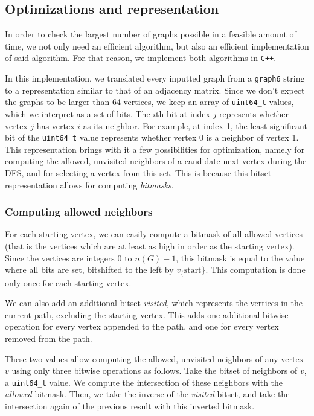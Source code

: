 \subsection{Optimizations and representation}

In order to check the largest number of graphs possible in a feasible amount of time, we not only need an efficient algorithm, but also an efficient implementation of said algorithm. For that reason, we implement both algorithms in \texttt{C++}.

In this implementation, we translated every inputted graph from a \texttt{graph6} string to a representation similar to that of an adjacency matrix. Since we don't expect the graphs to be larger than 64 vertices, we keep an array of \texttt{uint64\_t} values, which we interpret as a set of bits. The $i$th bit at index $j$ represents whether vertex $j$ has vertex $i$ as its neighbor. For example, at index 1, the least significant bit of the \texttt{uint64\_t} value represents whether vertex 0 is a neighbor of vertex 1. This representation brings with it a few possibilities for optimization, namely for computing the allowed, unvisited neighbors of a candidate next vertex during the DFS, and for selecting a vertex from this set. This is because this bitset representation allows for computing \textit{bitmasks}.

\subsubsection{Computing allowed neighbors}

For each starting vertex, we can easily compute a bitmask of all allowed vertices (that is the vertices which are at least as high in order as the starting vertex). Since the vertices are integers $0$ to $n(G)-1$, this bitmask is equal to the value where all bits are set, bitshifted to the left by $v_\{\text{start}\}$. This computation is done only once for each starting vertex.

We can also add an additional bitset \textit{visited}, which represents the vertices in the current path, excluding the starting vertex. This adds one additional bitwise operation for every vertex appended to the path, and one for every vertex removed from the path.

These two values allow computing the allowed, unvisited neighbors of any vertex $v$ using only three bitwise operations as follows. Take the bitset of neighbors of $v$, a \texttt{uint64\_t} value. We compute the intersection of these neighbors with the \textit{allowed} bitmask. Then, we take the inverse of the \textit{visited} bitset, and take the intersection again of the previous result with this inverted bitmask.

